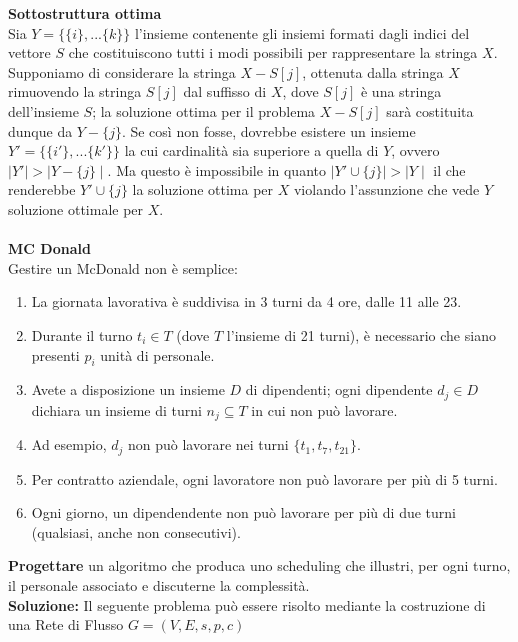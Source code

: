 \documentclass[../cheatSheetAlgoritmi.tex]{subfiles}
\begin{document}
\textbf{Sottostruttura ottima} \\
Sia $Y = \{\{i\}, ... \{k\}\}$ l'insieme contenente gli insiemi formati dagli indici del vettore $S$ che costituiscono tutti i modi possibili per rappresentare la stringa $X$. \\
Supponiamo di considerare la stringa $X - {S[j]}$, ottenuta dalla stringa $X$ rimuovendo la stringa $S[j]$ dal suffisso di $X$, dove $S[j]$ è una stringa dell'insieme $S$; la soluzione ottima per il problema $X - {S[j]}$ sarà costituita dunque da $Y - \{j\}$. Se così non fosse, dovrebbe esistere un insieme $Y' = \{\{i'\}, ... \{k'\}\}$ la cui cardinalità sia superiore a quella di $Y$, ovvero $\mid Y' \mid > \mid Y - \{j\} \mid$. Ma questo è impossibile in quanto $\mid Y' \cup \{j\} \mid > \mid Y \mid$ il che renderebbe $Y' \cup \{j\}$ la soluzione ottima per $X$ violando l'assunzione che vede $Y$ soluzione ottimale per $X$.\\\\
\textbf{MC Donald}\\
Gestire un McDonald non è semplice:
\begin{enumerate}
	\item La giornata lavorativa è suddivisa in 3 turni da 4 ore, dalle 11 alle 23.
	\item Durante il turno $t_{i} \in T$ (dove $T$ l'insieme di 21 turni), è necessario che siano presenti $p_{i}$ unità di personale. 
	\item Avete a disposizione un insieme $D$ di dipendenti; ogni dipendente $d_{j} \in D$ dichiara un insieme di turni $n_{j} \subseteq T$ in cui non può lavorare.
	\item Ad esempio, $d_{j}$ non può lavorare nei turni $\{t_{1}, t_{7}, t_{21}\}$.
	\item Per contratto aziendale, ogni lavoratore non può lavorare per più di 5 turni.
	\item Ogni giorno, un dipendendente non può lavorare per più di due turni (qualsiasi, anche non consecutivi).
\end{enumerate}
\textbf{Progettare} un algoritmo che produca uno scheduling che illustri, per ogni turno, il personale associato e discuterne la complessità.\\
\textbf{Soluzione:} Il seguente problema può essere risolto mediante la costruzione di una Rete di Flusso $G = (V, E, s, p, c)$
\end{document}
